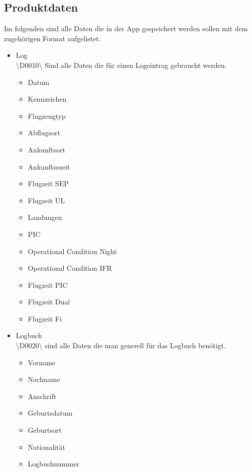 \documentclass[a4paper]{article} %
\begin{document}
    \subsection{Produktdaten}
    \vspace{1cm}
    Im folgenden sind alle Daten die in der App gespeichert werden sollen mit dem zugehörigen Format aufgelistet.
    \vspace{0.5cm}
    \begin{itemize}
        \item Log\\
        \textbackslash D0010\textbackslash{} Sind alle Daten die für einen Logeintrag gebraucht werden.
        \begin{itemize}
            \item Datum
            \item Kennzeichen
            \item Flugzeugtyp
            \item Abflugsort
            \item Ankunftsort
            \item Ankunftsszeit
            \item Flugzeit SEP
            \item Flugzeit UL
            \item Landungen
            \item PIC
            \item Operational Condition Night
            \item Operational Condition IFR
            \item Flugzeit PIC
            \item Flugzeit Dual
            \item Flugzeit Fi
        \end{itemize}
        \item Logbuch\\
        \textbackslash D0020\textbackslash{} sind alle Daten die man generell für das Logbuch benötigt.
        \begin{itemize}
            \item Vorname
            \item Nachname
            \item Anschrift
            \item Geburtsdatum
            \item Geburtsort
            \item Nationalität
            \item Logbuchnummer

\end{itemize}
\end{itemize}
\end{document}
